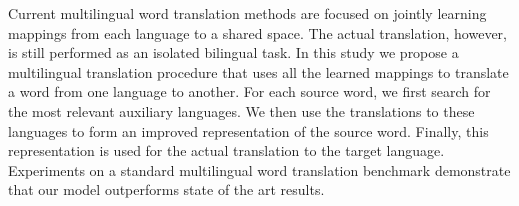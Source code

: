 Current multilingual word translation methods are focused on jointly learning mappings from each language  to a shared space. The actual translation, however,  is still performed as an isolated  bilingual task. In this study we propose a multilingual translation procedure that uses all the learned mappings to translate a word from one language to another.  For each source word, we first search for the most relevant auxiliary languages. We then use the translations to these languages to form  an improved representation of the source word. Finally, this representation  is used for the  actual translation to the target language. Experiments on a standard multilingual word translation benchmark demonstrate that our model outperforms state of the art results.